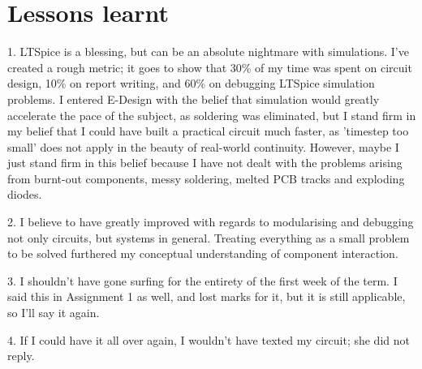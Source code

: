 \section{Lessons learnt}
1. LTSpice is a blessing, but can be an absolute nightmare with simulations. I've created a rough metric; it goes to show that 30\% of my time was spent on circuit design, 10\% on report writing, and 60\% on debugging LTSpice simulation problems. I entered E-Design with the belief that simulation would greatly accelerate the pace of the subject, as soldering was eliminated, but I stand firm in my belief that I could have built a practical circuit much faster, as 'timestep too small' does not apply in the beauty of real-world continuity. However, maybe I just stand firm in this belief because I have not dealt with the problems arising from burnt-out components, messy soldering, melted PCB tracks and exploding diodes.

2. I believe to have greatly improved with regards to modularising and debugging not only circuits, but systems in general. Treating everything as a small problem to be solved furthered my conceptual understanding of component interaction.

3. I shouldn't have gone surfing for the entirety of the first week of the term. I said this in Assignment 1 as well, and lost marks for it, but it is still applicable, so I'll say it again.

4. If I could have it all over again, I wouldn't have texted my circuit; she did not reply.